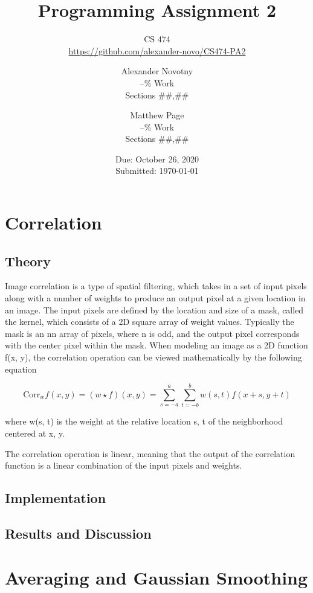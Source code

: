 \documentclass[headings=optiontoheadandtoc,listof=totoc,parskip=full]{scrartcl}
\title{Programming Assignment 2}
\subtitle{CS 474\\\url{https://github.com/alexander-novo/CS474-PA2}}
\author{Alexander Novotny\\--\% Work\\Sections \#\#,\#\# \and Matthew Page\\--\% Work\\Sections \#\#,\#\#}
\date{Due: October 26, 2020 \\ Submitted: \today}
\begin{document}
\maketitle
\tableofcontents
{}

\newpage
{}

\section{Correlation}
\label{sec:correlation}

\subsection{Theory}

Image correlation is a type of spatial filtering, which takes in a set of input pixels along with a number of weights to produce an output pixel at a given location in an image. The input pixels are defined by the location and size of a mask, called the kernel, which consists of a 2D square array of weight values. Typically the mask is an nn array of pixels, where n is odd, and the output pixel corresponds with the center pixel within the mask. When modeling an image as a 2D function f(x, y), the correlation operation can be viewed mathematically by the following equation

\[\text{Corr}_w f(x, y) = (w \star f)(x, y) = \sum_{s=-a}^a \sum_{t=-b}^b w(s, t) f(x+s, y+t)\]

where w(s, t) is the weight at the relative location s, t of the neighborhood centered at x, y.

The correlation operation is linear, meaning that the output of the correlation function is a linear combination of the input pixels and weights. 


\subsection{Implementation}


\subsection{Results and Discussion}


\section{Averaging and Gaussian Smoothing}
\label{sec:smoothing}
\end{document}
